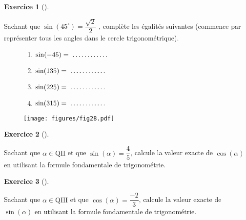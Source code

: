 \documentclass[
  a4paper,
  DIV=11,
  numbers=noendperiod,
  oneside]{scrreprt}
\theoremstyle{definition}
\theoremstyle{definition}
\newtheorem{exercise}{Exercice}[chapter]
\theoremstyle{plain}
\theoremstyle{definition}
\theoremstyle{remark}
\begin{document}
\begin{exercise}[]\protect\hypertarget{exr-}{}\label{exr-}

Sachant que \(\sin(45^\circ) = \dfrac{\sqrt{2}}{2}\) , complète les
égalités suivantes (commence par représenter tous les angles dans le
cercle trigonométrique).

\begin{figure}

\begin{minipage}{0.60\linewidth}

\begin{enumerate}
\def\labelenumi{\arabic{enumi})}
\item
  \(\sin(-45)=\makebox[2cm]{\dotfill}\)
\item
  \(\sin(135)=\makebox[2cm]{\dotfill}\)
\item
  \(\sin(225)=\makebox[2cm]{\dotfill}\)
\item
  \(\sin(315)=\makebox[2cm]{\dotfill}\)
\end{enumerate}

\end{minipage}%
%
\begin{minipage}{0.40\linewidth}
\begin{center}
\texttt{[image: figures/fig28.pdf]}
\end{center}
\end{minipage}%

\end{figure}%

\end{exercise}

\begin{exercise}[]\protect\hypertarget{exr-}{}\label{exr-}

Sachant que \(\alpha\in\text{QII}\) et que
\(\sin(\alpha) = \dfrac{4}{5}\), calcule la valeur exacte de
\(\cos(\alpha)\) en utilisant la formule fondamentale de trigonométrie.

\end{exercise}

\begin{exercise}[]\protect\hypertarget{exr-}{}\label{exr-}

Sachant que \(\alpha\in\text{QIII}\) et que
\(\cos(\alpha) = \dfrac{-2}{3}\), calcule la valeur exacte de
\(\sin(\alpha)\) en utilisant la formule fondamentale de trigonométrie.

\end{exercise}

\newpage{}
\end{document}
